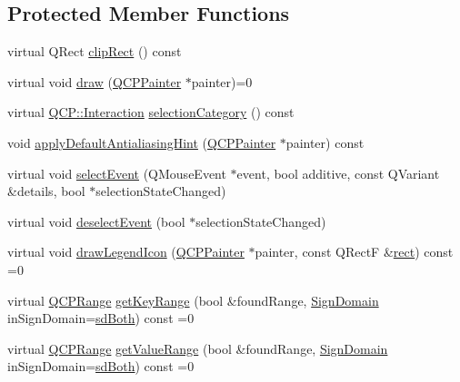 \subsection*{Protected Member Functions}
\begin{DoxyCompactItemize}
\item 
virtual Q\+Rect \hyperlink{class_q_c_p_abstract_plottable_ac01960b0827913922f5364d559c124ed}{clip\+Rect} () const 
\item 
virtual void \hyperlink{class_q_c_p_abstract_plottable_acbab5e30dcd04fd302b4a5902ac2c482}{draw} (\hyperlink{class_q_c_p_painter}{Q\+C\+P\+Painter} $\ast$painter)=0
\item 
virtual \hyperlink{namespace_q_c_p_a2ad6bb6281c7c2d593d4277b44c2b037}{Q\+C\+P\+::\+Interaction} \hyperlink{class_q_c_p_abstract_plottable_a5eef607bcc2aee8bfe2380a8710f6c64}{selection\+Category} () const 
\item 
void \hyperlink{class_q_c_p_abstract_plottable_a76e9d6cc7972dc1528f526d163766aca}{apply\+Default\+Antialiasing\+Hint} (\hyperlink{class_q_c_p_painter}{Q\+C\+P\+Painter} $\ast$painter) const 
\item 
virtual void \hyperlink{class_q_c_p_abstract_plottable_a16aaad02456aa23a759efd1ac90c79bf}{select\+Event} (Q\+Mouse\+Event $\ast$event, bool additive, const Q\+Variant \&details, bool $\ast$selection\+State\+Changed)
\item 
virtual void \hyperlink{class_q_c_p_abstract_plottable_a6fa0d0f95560ea8b01ee13f296dab2b1}{deselect\+Event} (bool $\ast$selection\+State\+Changed)
\item 
virtual void \hyperlink{class_q_c_p_abstract_plottable_a9a450783fd9ed539e589999fd390cdf7}{draw\+Legend\+Icon} (\hyperlink{class_q_c_p_painter}{Q\+C\+P\+Painter} $\ast$painter, const Q\+Rect\+F \&\hyperlink{_gen_blob_8m_aea8f6815d9a63491fc422c5572c6b3c3}{rect}) const =0
\item 
virtual \hyperlink{class_q_c_p_range}{Q\+C\+P\+Range} \hyperlink{class_q_c_p_abstract_plottable_a345d702b2e7e12c8cfdddff65ba85e8c}{get\+Key\+Range} (bool \&found\+Range, \hyperlink{class_q_c_p_abstract_plottable_a661743478a1d3c09d28ec2711d7653d8}{Sign\+Domain} in\+Sign\+Domain=\hyperlink{class_q_c_p_abstract_plottable_a661743478a1d3c09d28ec2711d7653d8a082b98cfb91a7363a3b5cd17b0c1cd60}{sd\+Both}) const =0
\item 
virtual \hyperlink{class_q_c_p_range}{Q\+C\+P\+Range} \hyperlink{class_q_c_p_abstract_plottable_aa3331b415b5939fe4df60b78831b2799}{get\+Value\+Range} (bool \&found\+Range, \hyperlink{class_q_c_p_abstract_plottable_a661743478a1d3c09d28ec2711d7653d8}{Sign\+Domain} in\+Sign\+Domain=\hyperlink{class_q_c_p_abstract_plottable_a661743478a1d3c09d28ec2711d7653d8a082b98cfb91a7363a3b5cd17b0c1cd60}{sd\+Both}) const =0

\end{DoxyCompactItemize}
